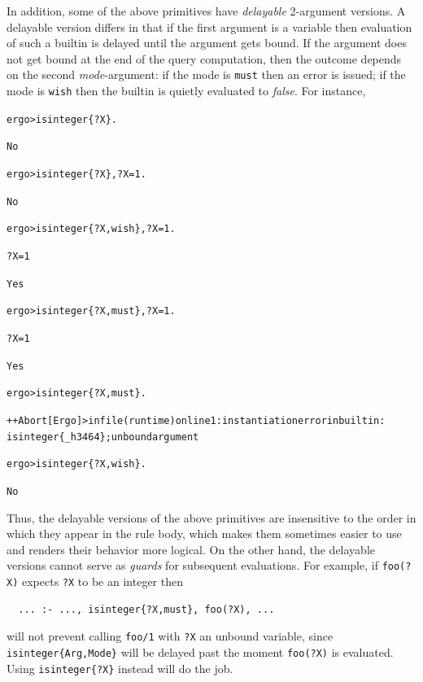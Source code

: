 \documentclass[11pt]{article}
\newcommand{\prompt}{ergo> }
\newcommand{\errorsystem}{Ergo}
\begin{document}
In addition, some of the above primitives have \emph{delayable} 2-argument
versions. A delayable version differs in that if the first argument is a
variable then evaluation of such a builtin is delayed until the argument
gets bound. If the argument does not get bound at the end of the query
computation, then the outcome depends on the second \emph{mode}-argument:
if the mode is
\texttt{must} then an error is issued; if the mode is \texttt{wish} then the
builtin is quietly evaluated to \emph{false}.  For instance,
\begin{alltt}
\prompt isinteger\{?X\}.

No

\prompt isinteger\{?X\}, ?X=1.

No

\prompt isinteger\{?X,wish\}, ?X=1.

?X = 1

Yes

\prompt isinteger\{?X,must\}, ?X=1.

?X = 1

Yes

\prompt isinteger\{?X,must\}.

++Abort[\errorsystem]> in file (runtime) on line 1: instantiation error in builtin:
                isinteger\{_h3464\}; unbound argument

\prompt isinteger\{?X,wish\}.

No
\end{alltt}
Thus, the delayable versions of the above primitives are insensitive to the
order in which they appear in the rule body, which makes them sometimes
easier to use and renders their behavior more logical. On the other hand, the
delayable versions cannot serve as \emph{guards} for subsequent
evaluations. For example, if \texttt{foo(?X)} expects \texttt{?X} to be
an integer then
\begin{verbatim}
  ... :- ..., isinteger{?X,must}, foo(?X), ...
\end{verbatim}
will not prevent calling \texttt{foo/1} with \texttt{?X} an unbound
variable,
since \texttt{isinteger\{Arg,Mode\}} will be delayed past the moment
\texttt{foo(?X)} is evaluated. Using \texttt{isinteger\{?X\}} instead will
do the job.
\end{document}
